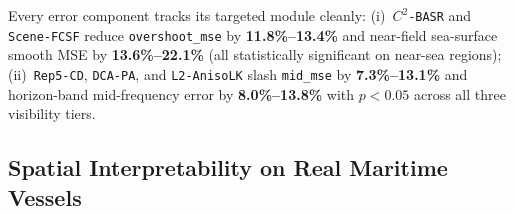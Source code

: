 \documentclass[journal,twoside]{IEEEtran}
\begin{document}
\begin{table}[t]
\centering
\caption{Paired Error Attribution of \texttt{014d} vs.\ \texttt{014b} Across 283 OWH Scenes ($^*$ Indicates $95\%$ Bootstrap CI Strictly Excludes Zero)}
\label{tab:paired}
\renewcommand{\arraystretch}{1.15}
\setlength{\tabcolsep}{3.6pt}
\end{table}

Every error component tracks its targeted module cleanly: (i)~\texttt{$C^2$-BASR} and \texttt{Scene-FCSF} reduce \texttt{overshoot\_mse} by \textbf{11.8\%--13.4\%} and near-field sea-surface smooth MSE by \textbf{13.6\%--22.1\%} (all statistically significant on near-sea regions); (ii)~\texttt{Rep5-CD}, \texttt{DCA-PA}, and \texttt{L2-AnisoLK} slash \texttt{mid\_mse} by \textbf{7.3\%--13.1\%} and horizon-band mid-frequency error by \textbf{8.0\%--13.8\%} with $p<0.05$ across all three visibility tiers.

\subsection{Spatial Interpretability on Real Maritime Vessels}
\label{sec:spatial}
\end{document}

